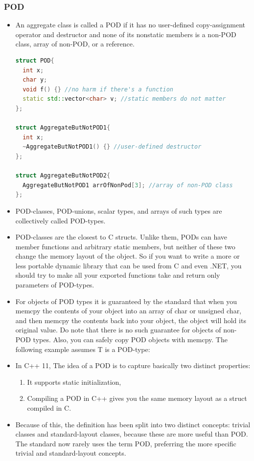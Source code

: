 \documentclass[a4paper,12pt,twoside]{book}
\begin{document}
\subsubsection{POD}
\begin{itemize}

\item An aggregate class is called a POD if it has no user-defined copy-assignment operator and destructor and none of its nonstatic members is a non-POD class, array of non-POD, or a reference.

\begin{lstlisting}[frame=single, language=c++]
struct POD{
  int x;
  char y;
  void f() {} //no harm if there's a function
  static std::vector<char> v; //static members do not matter
};

struct AggregateButNotPOD1{
  int x;
  ~AggregateButNotPOD1() {} //user-defined destructor
};

struct AggregateButNotPOD2{
  AggregateButNotPOD1 arrOfNonPod[3]; //array of non-POD class
};
\end{lstlisting}


\item POD-classes, POD-unions, scalar types, and arrays of such types are collectively called POD-types.

\item POD-classes are the closest to C structs. Unlike them, PODs can have member functions and arbitrary static members, but neither of these two change the memory layout of the object. So if you want to write a more or less portable dynamic library that can be used from C and even .NET, you should try to make all your exported functions take and return only parameters of POD-types.

\item For objects of POD types it is guaranteed by the standard that when you memcpy the contents of your object into an array of char or unsigned char, and then memcpy the contents back into your object, the object will hold its original value. Do note that there is no such guarantee for objects of non-POD types. Also, you can safely copy POD objects with memcpy. The following example assumes T is a POD-type:


\item In C++ 11, The idea of a POD is to capture basically two distinct properties:
\begin{enumerate}
	\item It supports static initialization,
	\item Compiling a POD in C++ gives you the same memory layout as a struct compiled in C.
\end{enumerate}

\item Because of this, the definition has been split into two distinct concepts: trivial classes and standard-layout classes, because these are more useful than POD. The standard now rarely uses the term POD, preferring the more specific trivial and standard-layout concepts.

\end{itemize}
\end{document}
